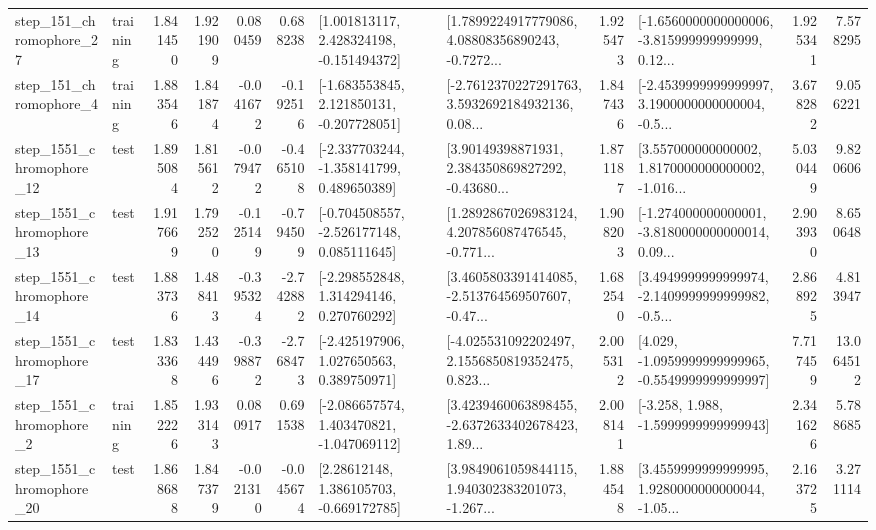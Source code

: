 \begin{tabular}{llrrrrllrlrr}
  step\_151\_chromophore\_27 &  training &      1.841450 &    1.921909 &      0.080459 &  0.688238 &    [1.001813117, 2.428324198, -0.151494372] &  [1.7899224917779086, 4.08808356890243, -0.7272... &       1.925473 &  [-1.6560000000000006, -3.815999999999999, 0.12... &            1.925341 &          7.578295 \\
   step\_151\_chromophore\_4 &  training &      1.883546 &    1.841874 &     -0.041672 & -0.192516 &   [-1.683553845, 2.121850131, -0.207728051] &  [-2.7612370227291763, 3.5932692184932136, 0.08... &       1.847436 &  [-2.4539999999999997, 3.1900000000000004, -0.5... &            3.678282 &          9.056221 \\
 step\_1551\_chromophore\_12 &      test &      1.895084 &    1.815612 &     -0.079472 & -0.465108 &   [-2.337703244, -1.358141799, 0.489650389] &  [3.90149398871931, 2.384350869827292, -0.43680... &       1.871187 &  [3.557000000000002, 1.8170000000000002, -1.016... &            5.030449 &          9.820606 \\
 step\_1551\_chromophore\_13 &      test &      1.917669 &    1.792520 &     -0.125149 & -0.794509 &   [-0.704508557, -2.526177148, 0.085111645] &  [1.2892867026983124, 4.207856087476545, -0.771... &       1.908203 &  [-1.274000000000001, -3.8180000000000014, 0.09... &            2.903930 &          8.650648 \\
 step\_1551\_chromophore\_14 &      test &      1.883736 &    1.488413 &     -0.395324 & -2.742882 &    [-2.298552848, 1.314294146, 0.270760292] &  [3.4605803391414085, -2.513764569507607, -0.47... &       1.682540 &  [3.4949999999999974, -2.1409999999999982, -0.5... &            2.868925 &          4.813947 \\
 step\_1551\_chromophore\_17 &      test &      1.833368 &    1.434496 &     -0.398872 & -2.768473 &    [-2.425197906, 1.027650563, 0.389750971] &  [-4.025531092202497, 2.1556850819352475, 0.823... &       2.005312 &  [4.029, -1.0959999999999965, -0.5549999999999997] &            7.717459 &         13.064512 \\
  step\_1551\_chromophore\_2 &  training &      1.852226 &    1.933143 &      0.080917 &  0.691538 &   [-2.086657574, 1.403470821, -1.047069112] &  [3.4239460063898455, -2.6372633402678423, 1.89... &       2.008141 &               [-3.258, 1.988, -1.5999999999999943] &            2.341626 &          5.788685 \\
 step\_1551\_chromophore\_20 &      test &      1.868688 &    1.847379 &     -0.021310 & -0.045674 &     [2.28612148, 1.386105703, -0.669172785] &  [3.9849061059844115, 1.940302383201073, -1.267... &       1.884548 &  [3.4559999999999995, 1.9280000000000044, -1.05... &            2.163725 &          3.271114 \\

\end{tabular}
